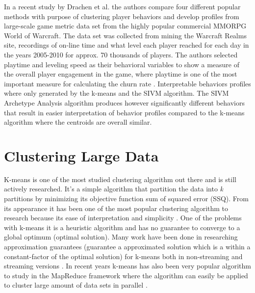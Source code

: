 In a recent study by Drachen et al. \citep{Drachen:2013} the authors compare four different popular methods with purpose of clustering player behaviors and develop profiles from large-scale game metric data set from the highly popular commercial MMORPG World of Warcraft. The data set was collected from mining the Warcraft Realms site, recordings of on-line time and what level each player reached for each day in the years 2005-2010 for approx. 70 thousands of players. The authors selected playtime and leveling speed as their behavioral variables to show a measure of the overall player engagement in the game, where playtime is one of the most important measure for calculating the churn rate \citep{Fields:2011SocialGame, Seif:2013GameAnalytics}. Interpretable behaviors profiles where only generated by the k-means and the SIVM algorithm. The SIVM Archetype Analysis algorithm produces however significantly different behaviors that result in easier interpretation of behavior profiles compared to the k-means algorithm where the centroids are overall similar.	

\section{Clustering Large Data}
K-means \citep{FORGYE.W.:1965, MacQueen:1967KMeans, Lloyd:1982} is one of the most studied clustering algorithm out there and is still actively researched. It's a simple algorithm that partition the data into \textit{k} partitions by minimizing its objective function sum of squared error (SSQ). From its appearance it has been one of the most popular clustering algorithm to research because its ease of interpretation and simplicity \citep{Xu:2005Clustering, Rokach:2010Survey}. One of the problems with k-means it is a heuristic algorithm and has no guarantee to converge to a global optimum (optimal solution). Many work have been done in researching approximation guarantees (guarantee a approximated solution which is a within a constant-factor of the optimal solution) for k-means both in non-streaming and streaming versions \citep{Kanungo:2002KM, Arthur:2007, Ailon:2009, Braverman:2011, Shindler:2011}. In recent years k-means has also been very popular algorithm to study in the MapReduce framework where the algorithm can easily be applied to cluster large amount of data sets in parallel \citep{Dean:2004, Zhao:2009, Ngazimbi:2009MSc, Christopoulos:2011Thesis, Ramamoorthy:2011MSc}.

